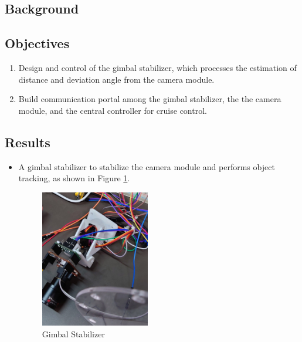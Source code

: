 \documentclass[12pt]{article}
\begin{document}
\subsection{Background}




\subsection{Objectives}

\begin{enumerate}

    \item {Design and control of the gimbal stabilizer, which processes the estimation of distance and deviation angle from the camera module.}
    \item {Build communication portal among the gimbal stabilizer, the the camera module, and the central controller for cruise control.}

\end{enumerate}

\subsection{Results}

\begin{itemize}

    \item {A gimbal stabilizer to stabilize the camera module and performs object tracking, as shown in Figure \ref*{Stabilizer-Control}.}
    \begin{figure}[H]
        \centering
        \includegraphics[width=0.45\textwidth]{portfolio/Gimbal.JPG}
        \caption{Gimbal Stabilizer}
        \label{Stabilizer-Control}
    \end{figure}

\end{itemize}
\end{document}
